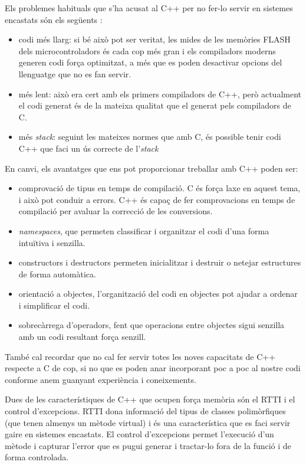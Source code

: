 Els problemes habituals que s'ha acusat al C++ per no fer-lo servir en sistemes encastats són els següents \cite{CXX_1}:
\begin{itemize}
 \item codi més llarg: si bé això pot ser veritat, les mides de les memòries \gls{FLASH} dels microcontroladors és cada cop més gran i els compiladors moderns generen codi força optimitzat, a més que es poden desactivar opcions del llenguatge que no es fan servir.
 \item més lent: això era cert amb els primers compiladors de C++, però actualment el codi generat és de la mateixa qualitat que el generat pels compiladors de C.
 \item més {\em stack}: seguint les mateixes normes que amb C, és possible tenir codi C++ que faci un ús correcte de l'{\em stack}
\end{itemize}

En canvi, els avantatges que ens pot proporcionar treballar amb C++ poden ser:
\begin{itemize}
 \item comprovació de tipus en temps de compilació. C és força laxe en aquest tema, i això pot conduir a errors. C++ és capaç de fer comprovacions en temps de compilació per avaluar la correcció de les conversions.
 \item {\em namespaces}, que permeten classificar i organitzar el codi d'una forma intuïtiva i senzilla.
 \item constructors i destructors permeten inicialitzar i destruir o netejar estructures de forma automàtica.
 \item orientació a objectes, l'organització del codi en objectes pot ajudar a ordenar i simplificar el codi.
 \item sobrecàrrega d'operadors, fent que operacions entre objectes sigui senzilla amb un codi resultant força senzill.
\end{itemize}

També cal recordar que no cal fer servir totes les noves capacitats de C++ respecte a C de cop, si no que es poden anar incorporant poc a poc al nostre codi conforme anem guanyant experiència i coneixements.

Dues de les característiques de C++ que ocupen força memòria són el \gls{RTTI} i el control d'excepcions. RTTI dona informació del tipus de classes polimòrfiques (que tenen almenys un mètode virtual) i és una característica que es faci servir gaire en sistemes encastats. El control d'excepcions permet l'execució d'un mètode i capturar l'error que es pugui generar i tractar-lo fora de la funció i de forma controlada.

